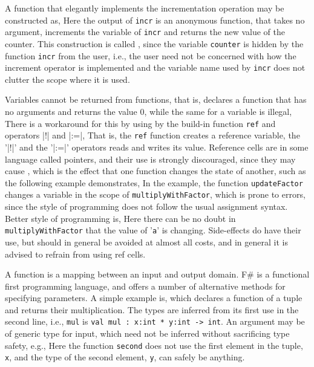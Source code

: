 A function that elegantly implements the incrementation operation may be constructed as,
%
%
 Here the output of \texttt{incr} is an anonymous function, that takes no argument, increments the variable of \texttt{incr} and returns the new value of the counter. This construction is called , since the variable \texttt{counter} is hidden by the function \texttt{incr} from the user, i.e., the user need not be concerned with how the increment operator is implemented and the variable name used by \texttt{incr} does not clutter the scope where it is used.

Variables cannot be returned from functions, that is,
%
%
declares a function that has no arguments and returns the value 0, while the same for a variable is illegal,
%
%
There is a workaround for this by using  by the build-in function \texttt{ref} and operators \token|!| and \token|:=|,
%
%
That is, the \texttt{ref} function creates a reference variable, the '\token|!|' and the '\token|:=|' operators reads and writes its value. Reference cells are in some language called pointers, and their use is strongly discouraged, since they may cause , which is the effect that one function changes the state of another, such as the following example demonstrates,
%
%
In the example, the function \texttt{updateFactor} changes a variable in the scope of \texttt{multiplyWithFactor}, which is prone to errors, since the style of programming does not follow the usual assignment syntax. Better style of programming is,
%
%
Here there can be no doubt in \texttt{multiplyWithFactor} that the value of '\texttt{a}' is changing. Side-effects do have their use, but should in general be avoided at almost all costs, and in general it is advised to refrain from using ref cells.














A function is a mapping between an input and output domain. F\# is a functional first programming language, and offers a number of alternative methods for specifying parameters. A simple example is,
which declares a function of a tuple and returns their multiplication. The types are inferred from its first use in the second line, i.e., \texttt{mul} is \texttt{val mul : x:int * y:int -> int}.  An argument may be of generic type for input, which need not be inferred without sacrificing type safety, e.g.,
Here the function \texttt{second} does not use the first element in the tuple, \texttt{x}, and the type of the second element, \texttt{y}, can safely be anything.

